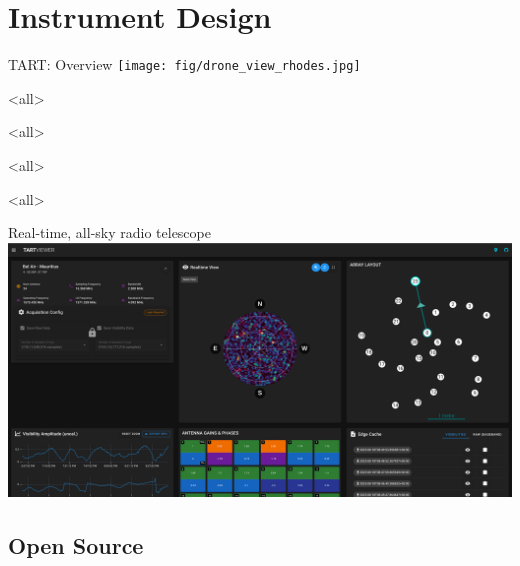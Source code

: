 \documentclass[ignorenonframetext]{beamer}
\begin{document}
\section{Instrument Design}

\frame{\tableofcontents[currentsection]}

% 
% 



\begin{frame}{TART: Overview}
   \texttt{[image: fig/drone\_view\_rhodes.jpg]}
\end{frame}




\mode<all>
{
\begin{frame}[plain]
\end{frame}
}
\mode<all>{\usebackgroundtemplate{}}

\mode<all>
{
\begin{frame}[plain]
\end{frame}
}
\mode<all>{\usebackgroundtemplate{}}


\begin{frame}{Real-time, all-sky radio telescope}
 \includegraphics[width=\textwidth]{fig/browser_view.png}
\end{frame}

\subsection*{Open Source}
\end{document}
